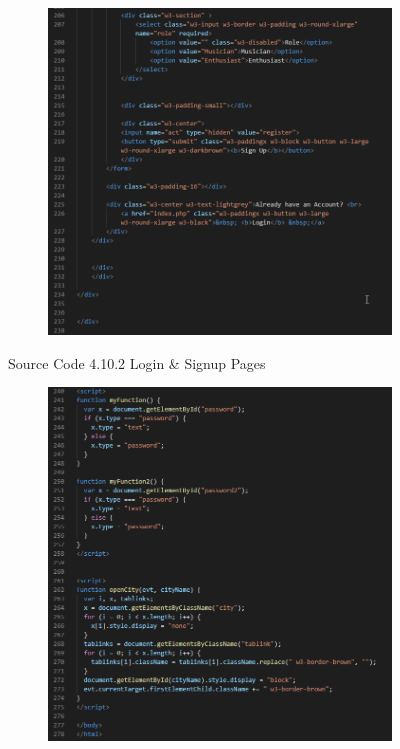 \begin{enumerate}[1.]
\begin{figure}[h]
\begin{subfigure}[b]{0.7\textwidth}
            \includegraphics[width=\textwidth]{mainmatter/images/frontend/code/loginsignup4.png}
            \label{fig:sub4}
        \end{subfigure}
        \caption*{Source Code 4.10.2 Login \& Signup Pages}
        \label{fig:myfig49b}
    \end{figure}
    \clearpage
    \begin{figure}[h]\ContinuedFloat
        \centering
        \begin{subfigure}[b]{0.6\textwidth}
            \centering
            \includegraphics[width=\textwidth]{mainmatter/images/frontend/code/loginsignup5.png}

\end{subfigure}
\end{figure}
\end{enumerate}
